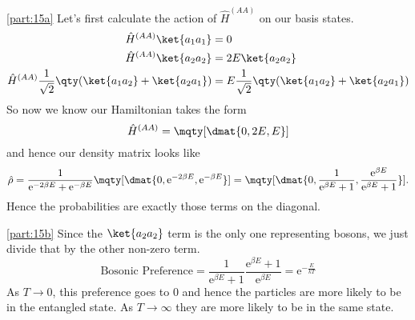 \documentclass[boxes,pages]{homework}
\makeatletter
\newcommand{\e}{\mathrm{e}}
\numberwithin{@problem}{section}
\makeatother
\begin{document}
\begin{solution}
	\ref{part:15a}
	Let's first calculate the action of $\hat{H}^{(AA)}$ on our basis states.
	\begin{align*}
		\hat{H}^{(AA)}\ket{a_1a_1}                                        & = 0                                                    \\
		\hat{H}^{(AA)}\ket{a_2a_2}                                        & = 2E\ket{a_2a_2}                                       \\
		\hat{H}^{(AA)}\frac{1}{\sqrt{2}}\qty(\ket{a_1a_2} + \ket{a_2a_1}) & = E\frac{1}{\sqrt{2}}\qty(\ket{a_1a_2} + \ket{a_2a_1}) \\
	\end{align*}
	So now we know our Hamiltonian takes the form
	\begin{equation*}
		\hat{H}^{(AA)} = \mqty[\dmat{0, 2E, E}]
	\end{equation*}
	and hence our density matrix looks like
	\begin{equation*}
		\hat{\rho} = \frac{1}{\e^{-2\beta E} + \e^{-\beta E}}\mqty[\dmat{0, \e^{-2\beta E}, \e^{-\beta E}}] = \mqty[\dmat{0, \frac{1}{\e^{\beta E} + 1}, \frac{\e^{\beta E}}{\e^{\beta E} + 1}}].
	\end{equation*}
	Hence the probabilities are exactly those terms on the diagonal.

	\ref{part:15b}
	Since the $\ket{a_2a_2}$ term is the only one representing bosons, we just divide that by the other non-zero term.
	\begin{equation*}
		\text{Bosonic Preference} = \frac{1}{\e^{\beta E} + 1}\frac{\e^{\beta E} + 1}{\e^{\beta E}} = \e^{-\frac{E}{kT}}
	\end{equation*}
	As $T\to 0$, this preference goes to 0 and hence the particles are more likely to be in the entangled state. As $T\to\infty$ they are more likely to be in the same state.
\end{solution}
\end{document}
